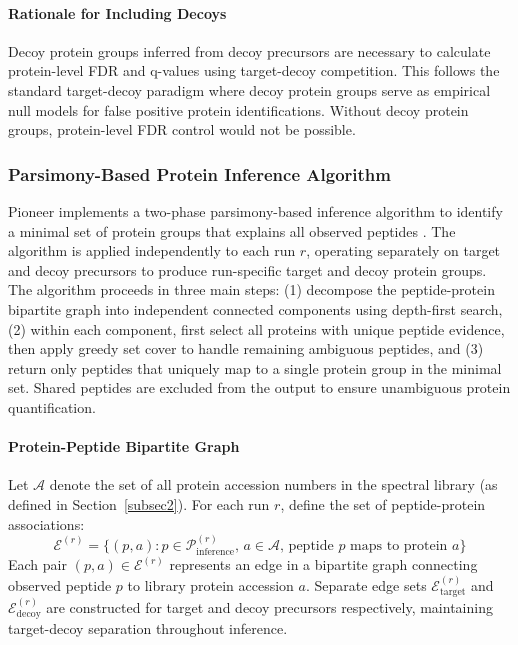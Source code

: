 \documentclass{article}
\begin{document}
\paragraph{Rationale for Including Decoys} Decoy protein groups inferred from decoy precursors are necessary to calculate protein-level FDR and q-values using target-decoy competition. This follows the standard target-decoy paradigm where decoy protein groups serve as empirical null models for false positive protein identifications. Without decoy protein groups, protein-level FDR control would not be possible.

\subsubsection{Parsimony-Based Protein Inference Algorithm}

Pioneer implements a two-phase parsimony-based inference algorithm to identify a minimal set of protein groups that explains all observed peptides \cite{Nesvizhskii2005,Zhang2007}. The algorithm is applied independently to each run $r$, operating separately on target and decoy precursors to produce run-specific target and decoy protein groups. The algorithm proceeds in three main steps: (1) decompose the peptide-protein bipartite graph into independent connected components using depth-first search, (2) within each component, first select all proteins with unique peptide evidence, then apply greedy set cover to handle remaining ambiguous peptides, and (3) return only peptides that uniquely map to a single protein group in the minimal set. Shared peptides are excluded from the output to ensure unambiguous protein quantification.

\paragraph{Protein-Peptide Bipartite Graph} Let $\mathcal{A}$ denote the set of all protein accession numbers in the spectral library (as defined in Section~\ref{subsec2}). For each run $r$, define the set of peptide-protein associations:
\begin{equation}
\mathcal{E}^{(r)} = \{(p, a) : p \in \mathcal{P}_{\text{inference}}^{(r)}, \, a \in \mathcal{A}, \, \text{peptide } p \text{ maps to protein } a\}
\end{equation}
Each pair $(p, a) \in \mathcal{E}^{(r)}$ represents an edge in a bipartite graph connecting observed peptide $p$ to library protein accession $a$. Separate edge sets $\mathcal{E}_{\text{target}}^{(r)}$ and $\mathcal{E}_{\text{decoy}}^{(r)}$ are constructed for target and decoy precursors respectively, maintaining target-decoy separation throughout inference.
\end{document}
